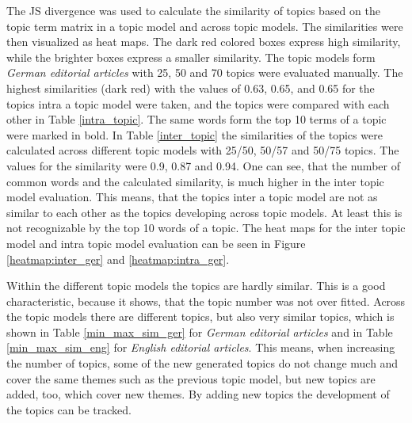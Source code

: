 The \ac{JS} divergence was used to calculate the similarity of topics based on the topic term matrix in a topic model and across topic models. The similarities were then visualized as heat maps. The dark red colored boxes express high similarity, while the brighter boxes express a smaller similarity.  
The topic models form \textit{German editorial articles} with 25, 50 and 70 topics were evaluated manually. The highest similarities (dark red) with the values of 0.63, 0.65, and 0.65 for the topics intra a topic model were taken, and the topics were compared with each other in Table \ref{intra_topic}. The same words form the top 10 terms of a topic were marked in bold. In Table \ref{inter_topic} the similarities of the topics were calculated across different topic models with 25/50, 50/57 and 50/75 topics. The values for the similarity were 0.9, 0.87 and 0.94. One can see, that the number of common words and the calculated similarity, is much higher in the inter topic model evaluation. This means, that the topics inter a topic model are not as similar to each other as the topics developing across topic models. At least this is not recognizable by the top 10 words of a topic. The heat maps for the inter topic model and intra topic model evaluation can be seen in Figure \ref{heatmap:inter_ger} and \ref{heatmap:intra_ger}.

Within the different topic models the topics are hardly similar. This is a good characteristic, because it shows, that the topic number was not over fitted. Across the topic models there are different topics, but also very similar topics, which is shown in Table \ref{min_max_sim_ger} for \textit{German editorial articles} and in Table \ref{min_max_sim_eng} for \textit{English editorial articles}. This means, when increasing the number of topics, some of the new generated topics do not change much and cover the same themes such as the previous topic model, but new topics are added, too, which cover new themes. By adding new topics the development of the topics can be tracked. 


